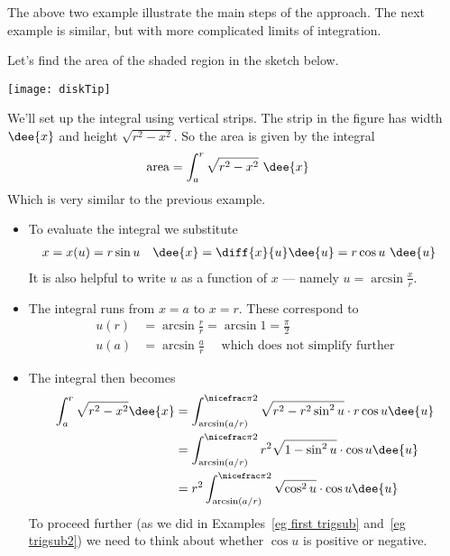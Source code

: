 The above two example illustrate the main steps of the approach. The next example is
similar, but with more complicated  limits of integration.


\begin{eg}\label{eg:INVTRIGa}
Let's find the area of the shaded region in the sketch below.
\begin{efig}
\begin{center}
  \texttt{[image: diskTip]}
\end{center}
\end{efig}
We'll set up the integral using vertical strips. The strip in the figure
has width $\dee{x}$ and height $\sqrt{r^2-x^2}$. So the area is given by the integral
\begin{align*}
\text{area} &= \int_a^r \sqrt{r^2-x^2}\ \dee{x}
\end{align*}
Which is very similar to the previous example.

\soln
\begin{itemize}
\item To evaluate the integral we substitute
\begin{align*}
x&=x(u)=r\sin u &
\dee{x} &= \diff{x}{u} \dee{u}  =r\cos u\ \dee{u}
\end{align*}
It is also helpful to write $u$ as a function of $x$ --- namely $u
=\arcsin\frac{x}{r}$.
\item The integral runs from $x=a$ to $x=r$. These correspond to
\begin{align*}
  u(r) &= \arcsin \frac{r}{r} = \arcsin 1 = \frac{\pi}{2} \\
  u(a) &= \arcsin \frac{a}{r} \quad \text{ which does not simplify further}
\end{align*}
\item The integral then becomes
\begin{align*}
  \int_a^r \sqrt{r^2-x^2} \dee{x}
&= \int_{\arcsin(a/r)}^{\nicefrac\pi2} \sqrt{r^2-r^2\sin^2u} \cdot r \cos u \dee{u}
\\
&= \int_{\arcsin(a/r)}^{\nicefrac\pi2} r^2 \sqrt{1-\sin^2u} \cdot \cos u \dee{u}\\
&= r^2\int_{\arcsin(a/r)}^{\nicefrac\pi2} \sqrt{\cos^2u} \cdot \cos u \dee{u}\\
\end{align*}
To proceed further (as we did in Examples~\ref{eg first trigsub} and~\ref{eg trigsub2})
we
need to think about whether $\cos u$ is positive or negative.


\end{itemize}
\end{eg}
